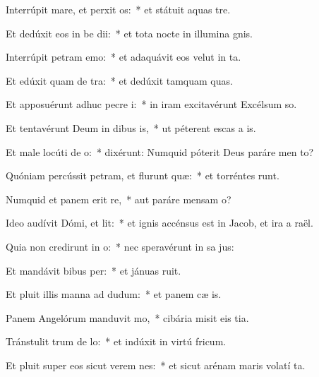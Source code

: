 \item Interrúpit mare, et perxit os:~* et státuit aquas   tre.
\item Et dedúxit eos in be dii:~* et tota nocte in illumina gnis.
\item Interrúpit petram  emo:~* et adaquávit eos velut in  ta.
\item Et edúxit quam de tra:~* et dedúxit tamquam  quas.
\item Et apposuérunt adhuc pecre i:~* in iram excitavérunt Excélsum  so.
\item Et tentavérunt Deum in dibus is,~* ut péterent escas a is.
\item Et male locúti  de o:~* dixérunt: Numquid póterit Deus paráre men  to?
\item Quóniam percússit petram, et flurunt quæ:~* et torréntes runt.
\item Numquid et panem erit re,~* aut paráre mensam  o?
\item Ideo audívit Dómi, et lit:~* et ignis accénsus est in Jacob, et ira a  raël.
\item Quia non credirunt in o:~* nec speravérunt in sa jus:
\item Et mandávit bibus per:~* et jánuas  ruit.
\item Et pluit illis manna ad dudum:~* et panem cæ  is.
\item Panem Angelórum manduvit mo,~* cibária misit eis  tia.
\item Tránstulit trum de lo:~* et indúxit in virtú  fricum.
\item Et pluit super eos sicut verem nes:~* et sicut arénam maris volatí ta.

